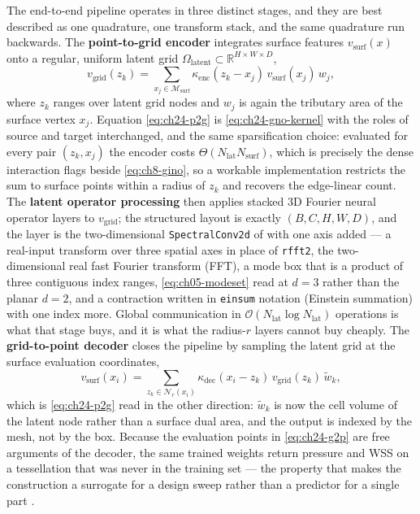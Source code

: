 The end-to-end pipeline operates in three distinct stages, and they are best described as one
quadrature, one transform stack, and the same quadrature run backwards. The
\textbf{point-to-grid encoder} integrates surface features $v_{\text{surf}}(x)$ onto a
regular, uniform latent grid $\Omega_{\text{latent}} \subset
\mathbb{R}^{H \times W \times D}$,
\begin{equation}
  \label{eq:ch24-p2g}
  v_{\text{grid}}(z_k) = \sum_{x_j \in \mathcal{M}_{\text{surf}}} \kappa_{\text{enc}}(z_k - x_j)
  \, v_{\text{surf}}(x_j) \, w_j,
\end{equation}
where $z_k$ ranges over latent grid nodes and $w_j$ is again the tributary area of the surface
vertex $x_j$. Equation \eqref{eq:ch24-p2g} is \eqref{eq:ch24-gno-kernel} with the roles of
source and target interchanged, and the same sparsification choice: evaluated for every pair
$(z_k, x_j)$ the encoder costs $\Theta(N_{\text{lat}} N_{\text{surf}})$, which is precisely
the dense interaction  flags
beside \eqref{eq:ch8-gino}, so a workable implementation restricts the sum to surface points
within a radius of $z_k$ and recovers the edge-linear count. The
\textbf{latent operator processing} then applies stacked 3D Fourier neural operator layers to
$v_{\text{grid}}$; the structured layout is exactly $(B, C, H, W, D)$, and the layer is the
two-dimensional \texttt{SpectralConv2d} of
 with one axis added --- a
real-input transform over three spatial axes in place of \texttt{rfft2}, the two-dimensional
real fast Fourier transform (FFT), a mode box that is a product of three contiguous index
ranges, \eqref{eq:ch05-modeset} read at $d=3$ rather than the planar $d=2$, and a contraction
written in
\texttt{einsum} notation (Einstein summation) with one index more.
Global communication in $\mathcal{O}(N_{\text{lat}} \log N_{\text{lat}})$ operations is what
that stage buys, and it is what the radius-$r$ layers cannot buy cheaply. The
\textbf{grid-to-point decoder} closes the pipeline by sampling the latent grid at the surface
evaluation coordinates,
\begin{equation}
  \label{eq:ch24-g2p}
  v_{\text{surf}}(x_i) = \sum_{z_k \in \mathcal{N}_r(x_i)} \kappa_{\text{dec}}(x_i - z_k) \,
  v_{\text{grid}}(z_k) \, \tilde{w}_k,
\end{equation}
which is \eqref{eq:ch24-p2g} read in the other direction: $\tilde{w}_k$ is now the cell volume
of the latent node rather than a surface dual area, and the output is indexed by the mesh, not
by the box. Because the evaluation points in \eqref{eq:ch24-g2p} are free arguments of the
decoder, the same trained weights return pressure and WSS on a tessellation that was never in
the training set --- the property that makes the construction a surrogate for a design sweep
rather than a predictor for a single part \cite{li2023geometry}.

